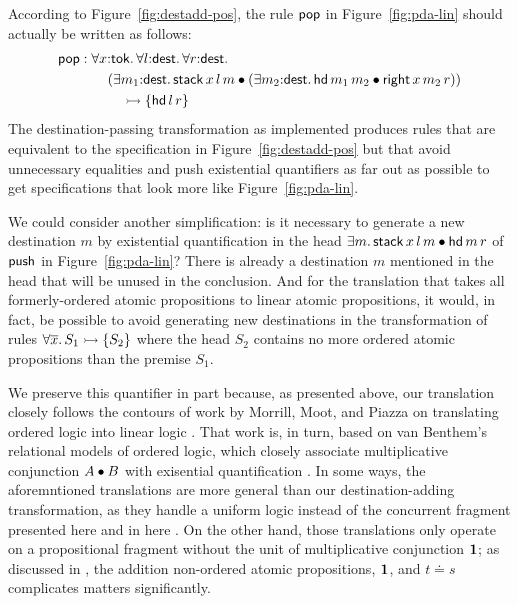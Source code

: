 According to Figure~\ref{fig:destadd-pos}, the rule 
${\sf pop}$ in Figure~\ref{fig:pda-lin} should actually be written as
follows:
\begin{align*} 
  {\sf pop} & : 
  \forall x{:}{\sf tok}.\,
  \forall l{:}{\sf dest}.\,
  \forall r{:}{\sf dest}.\,
  \\
  & \qquad (\exists m_1{:}{\sf dest}.\, {\sf stack}\,x\,l\,m \mathbin{\bullet}
   (\exists m_2{:}{\sf dest}.\, {\sf hd}\,m_1\,m_2 \mathbin{\bullet}
     {\sf right}\,x\,m_2\,r))
  \\ 
  & \qquad\quad \rightarrowtail
  \{ 
    {\sf hd}\,l\,r
  \}
\end{align*}
The destination-passing transformation as
implemented produces rules that are
equivalent to the specification in Figure~\ref{fig:destadd-pos}
but that avoid unnecessary equalities and push existential quantifiers
as far out as possible to get specifications that look more like
Figure~\ref{fig:pda-lin}. 

We could consider another simplification: is it necessary to generate
a new destination $m$ by existential quantification in the head
$\exists m.\,{\sf stack}\,x\,l\,m \mathbin{\bullet} {\sf hd}\,m\,r$ of ${\sf
  push}$ in Figure~\ref{fig:pda-lin}? There is already a destination
$m$ mentioned in the head that will be unused in the conclusion.  And
for the translation that takes all formerly-ordered atomic
propositions to linear atomic propositions, it would, in fact, be
possible to avoid generating new destinations in the transformation of
rules $\forall \overline{x}.\,S_1 \rightarrowtail \{ S_2 \}$ where the head
$S_2$ contains no more ordered atomic propositions than the premise
$S_1$. 

We preserve this quantifier in part because, as presented above, our
translation closely follows the contours of work by Morrill, Moot, and
Piazza on translating ordered logic into linear logic
\cite{morrill95higher,moot01linguistic}. That work is, in turn, based
on van Benthem's relational models of ordered logic, which closely
associate multiplicative conjunction $A \mathbin{\bullet} B$ with exisential
quantification \cite{vanbenthem91relational}. In some ways, the
aforemntioned translations are more general than our
destination-adding transformation, as they handle a uniform logic
instead of the concurrent fragment presented here and in here
\cite{simmons11logical}. On the other hand, those translations only
operate on a propositional fragment without the unit of multiplicative
conjunction $\mathbf{1}$; as discussed in \cite[p.~57]{simmons11logical},
the addition non-ordered atomic propositions, $\mathbf{1}$, and $t \doteq s$
complicates matters significantly. 

